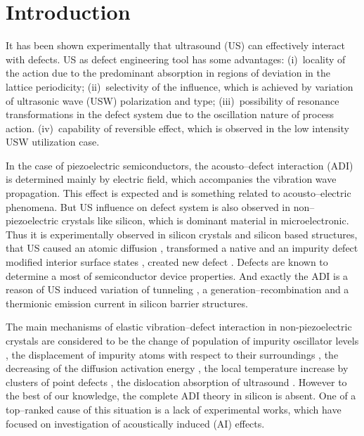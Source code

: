 \documentclass[aip,jap, amsmath,amssymb,reprint]{revtex4-1}
\begin{document}
\section{Introduction}
It has been shown experimentally that ultrasound (US) can effectively interact with defects.
US as defect engineering tool has some advantages:
(i)~locality of the action due to the predominant absorption in regions of deviation in the lattice periodicity;
(ii)~selectivity of the influence, which is achieved by variation of ultrasonic wave (USW) polarization and type;
(iii)~possibility of resonance transformations in the defect system due to the oscillation nature of process action.
(iv)~capability of reversible effect, which is observed in the low intensity USW utilization case.

In the case of piezoelectric semiconductors, the acousto--defect interaction (ADI) is determined mainly by electric field, which accompanies the vibration wave propagation.
This effect is expected and is something related to acousto--electric phenomena.
But US influence on defect system is also observed in non--piezoelectric crystals like silicon, which is dominant material in microelectronic.
Thus it is experimentally observed in silicon crystals and silicon based structures, that US
caused an atomic diffusion \cite{Roman:2010JAP,Roman:2007APL},
transformed a native and an impurity defect \cite{Ostapenko1994,Korotchenkov1995,Olikh2009Sem,Ostapenko1995,Ostrovskii2001}
modified  interior surface states \cite{UST:Medvid,Zaver:2008,Mirsagatov},
created new defect \cite{Savkina2015,Virot}.
Defects are known to determine a most of semiconductor device properties.
And exactly the ADI is a reason of US induced variation of tunneling \cite{Olikh2016JSem,Olikh2011Sem}, a generation--recombination \cite{Davletova2009,Davletova2008,YOlikh2005} and  a thermionic emission \cite{OlikhJAP,Olikh:Ultras} current in silicon barrier structures.

The main mechanisms of elastic vibration--defect interaction in non-piezoelectric crystals are considered to be
the  change  of  population  of  impurity  oscillator  levels  \cite{Pavlovich},
the displacement of impurity atoms with respect to their surroundings \cite{Korotchenkov1995,MirzadeJAP2011,PeleshchakUJF2016},
the decreasing of the diffusion activation  energy \cite{Krevchik},
the local temperature increase by clusters of point defects \cite{MirzadeJAP2005},
the dislocation absorption of ultrasound \cite{Davletova2008,OstrovKor92,Olikh:Ultras2016}.
However to the best of our knowledge, the complete ADI theory in silicon is absent.
One of a top--ranked cause of  this situation is a lack of experimental works, which have focused on investigation of acoustically induced (AI) effects.
\end{document}
